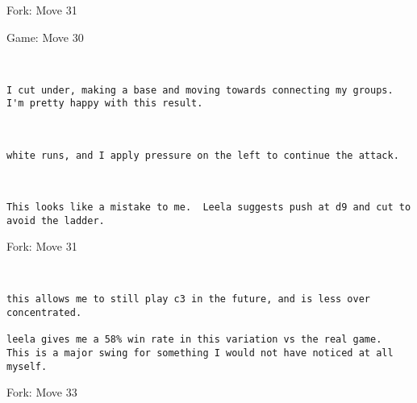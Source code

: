 \documentclass{article}
\begin{document}
\begin{subsection}{Fork: Move 31}
\end{subsection}
\newpage
\begin{section}{Game: Move 30}
\begin{center}
\cleargoban
{}
\showfullgoban
\\\begin{lstlisting}
I cut under, making a base and moving towards connecting my groups.  I'm pretty happy with this result. 
\end{lstlisting}
\end{center}
\begin{center}
\cleargoban
{}
\showfullgoban
\\\begin{lstlisting}
white runs, and I apply pressure on the left to continue the attack. 
\end{lstlisting}
\end{center}
\begin{center}
\cleargoban
{}
\showfullgoban
\\\begin{lstlisting}
This looks like a mistake to me.  Leela suggests push at d9 and cut to avoid the ladder. 
\end{lstlisting}
\end{center}
\end{section}
\begin{subsection}{Fork: Move 31}
\begin{center}
\cleargoban
{}
\showfullgoban
\\\begin{lstlisting}
this allows me to still play c3 in the future, and is less over concentrated. 

leela gives me a 58% win rate in this variation vs the real game.  This is a major swing for something I would not have noticed at all myself. 
\end{lstlisting}
\end{center}
\end{subsection}
\begin{subsection}{Fork: Move 33}
\end{subsection}
\end{document}
